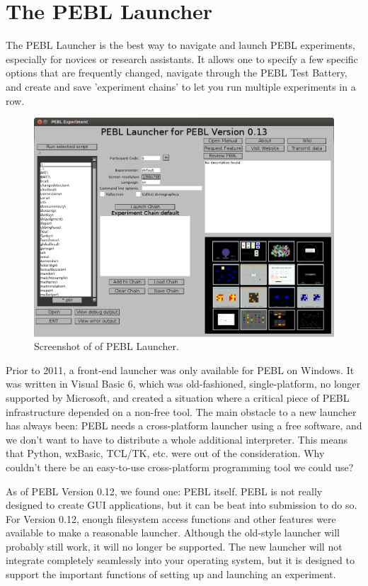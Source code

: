 
\chapter
{The PEBL Launcher}

The PEBL Launcher is the best way to navigate and launch PEBL
experiments, especially for novices or research assistants.  It allows
one to specify a few specific options that are frequently changed,
navigate through the PEBL Test Battery, and create and save
'experiment chains' to let you run multiple experiments in a row.

\begin{figure}[h]
\caption{Screenshot of of PEBL Launcher.}
\center
\includegraphics[scale=.35]{images/launcher.png} 
\end{figure}
\clearpage
{}
Prior to 2011, a front-end launcher was only available for PEBL on
Windows.  It was written in Visual Basic 6, which was old-fashioned,
single-platform, no longer supported by Microsoft, and created a
situation where a critical piece of PEBL infrastructure depended on a
non-free tool.  The main obstacle to a new launcher has always been:
PEBL needs a cross-platform launcher using a free software, and we
don't want to have to distribute a whole additional interpreter.  This
means that Python, wxBasic, TCL/TK, etc. were out of the
consideration.  Why couldn't there be an easy-to-use cross-platform
programming tool we could use?

As of PEBL Version 0.12, we found one: PEBL itself.  PEBL is not
really designed to create GUI applications, but it can be beat into
submission to do so.  For Version 0.12, enough filesystem access
functions and other features were available to make a reasonable
launcher.  Although the old-style launcher will probably still work,
it will no longer be supported.  The new launcher will not integrate
completely seamlessly into your operating system, but it is designed
to support the important functions of setting up and launching an
experiment.

